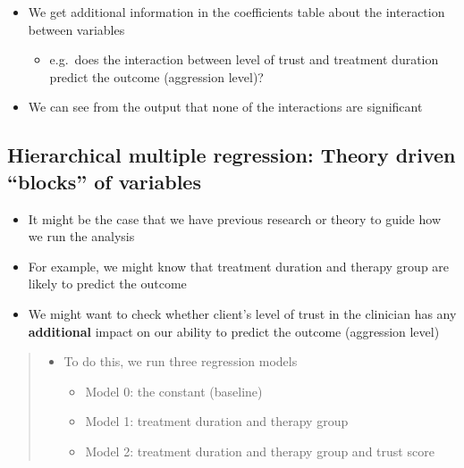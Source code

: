 \documentclass[
]{book}
\providecommand{\tightlist}{%
  \setlength{\itemsep}{0pt}\setlength{\parskip}{0pt}}
\begin{document}
\begin{itemize}
\tightlist
\item
  We get additional information in the coefficients table about the interaction between variables

  \begin{itemize}
  \tightlist
  \item
    e.g.~does the interaction between level of trust and treatment duration predict the outcome (aggression level)?
  \end{itemize}
\item
  We can see from the output that none of the interactions are significant
\end{itemize}

\hypertarget{hierarchical-multiple-regression-theory-driven-blocks-of-variables}{%
\subsection{Hierarchical multiple regression: Theory driven ``blocks'' of variables}\label{hierarchical-multiple-regression-theory-driven-blocks-of-variables}}

\begin{itemize}
\tightlist
\item
  It might be the case that we have previous research or theory to guide how we run the analysis
\item
  For example, we might know that treatment duration and therapy group are likely to predict the outcome
\item
  We might want to check whether client's level of trust in the clinician has any \textbf{additional} impact on our ability to predict the outcome (aggression level)
\end{itemize}

\begin{quote}
\begin{itemize}
\tightlist
\item
  To do this, we run three regression models

  \begin{itemize}
  \tightlist
  \item
    Model 0: the constant (baseline)
  \item
    Model 1: treatment duration and therapy group
  \item
    Model 2: treatment duration and therapy group and trust score
  \end{itemize}
\end{itemize}
\end{quote}
\end{document}
